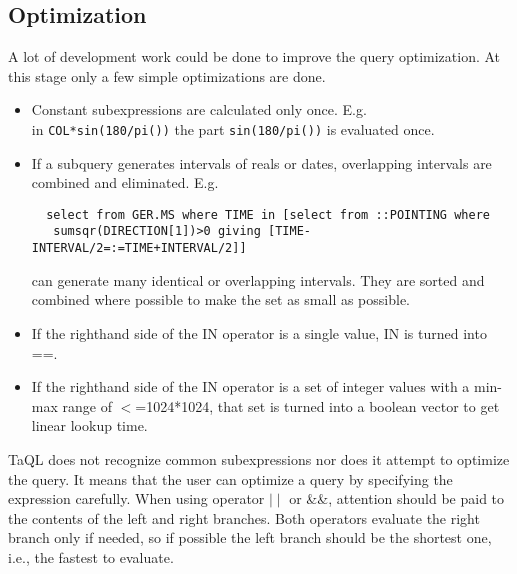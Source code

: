 \subsection{Optimization}
A lot of development work could be done to improve the query optimization.
At this stage only a few simple optimizations are done.
\begin{itemize}
\item Constant subexpressions are calculated only once. E.g.
\\in \texttt{COL*sin(180/pi())} the part \texttt{sin(180/pi())} is
evaluated once.
\item If a subquery generates intervals of reals or dates, overlapping
intervals are combined and eliminated. E.g.
\begin{verbatim}
  select from GER.MS where TIME in [select from ::POINTING where
   sumsqr(DIRECTION[1])>0 giving [TIME-INTERVAL/2=:=TIME+INTERVAL/2]]
\end{verbatim}
can generate many identical or overlapping intervals. They are
sorted and combined where possible to make the set as small as
possible.
\item If the righthand side of the IN operator is a single value, IN
  is turned into ==.
\item If the righthand side of the IN operator is a set of integer
  values with a min-max range of $<$=1024*1024, that set is turned into
  a boolean vector to get linear lookup time.
\end{itemize}

TaQL does not recognize common subexpressions nor does it attempt to
optimize the query.
It means that the user can optimize a query by specifying the expression
carefully. When using operator $\mid\mid$ or \&\&,
attention should be
paid to the contents of the left and right branches. Both operators
evaluate the right branch only if needed, so if possible the left branch
should be the shortest one, i.e., the fastest to evaluate.


